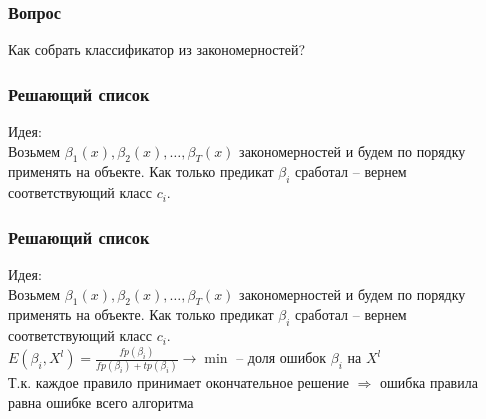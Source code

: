 \documentclass[12pt]{beamer}
\begin{document}
\begin{frame}\frametitle{Вопрос}
Как собрать классификатор из закономерностей?
\end{frame}

\begin{frame}\frametitle{Решающий список}
Идея:\\
Возьмем $\beta_1(x), \beta_2(x), \dots, \beta_T(x)$ закономерностей и будем по порядку применять на объекте. 
Как только предикат $\beta_i$ сработал -- вернем соответствующий класс $c_i$.
\end{frame}

\begin{frame}\frametitle{Решающий список}
Идея:\\
Возьмем $\beta_1(x), \beta_2(x), \dots, \beta_T(x)$ закономерностей и будем по порядку применять на объекте. 
Как только предикат $\beta_i$ сработал -- вернем соответствующий класс $c_i$.\\
\vspace{5mm}
$E(\beta_i, X^l) = \frac{fp(\beta_i)}{fp(\beta_i)+tp(\beta_i)} \rightarrow \min$ -- доля ошибок $\beta_i$ на $X^l$\\
\vspace{5mm}
Т.к. каждое правило принимает окончательное решение $\Rightarrow$ ошибка правила равна ошибке всего алгоритма
\end{frame}

\end{document}
